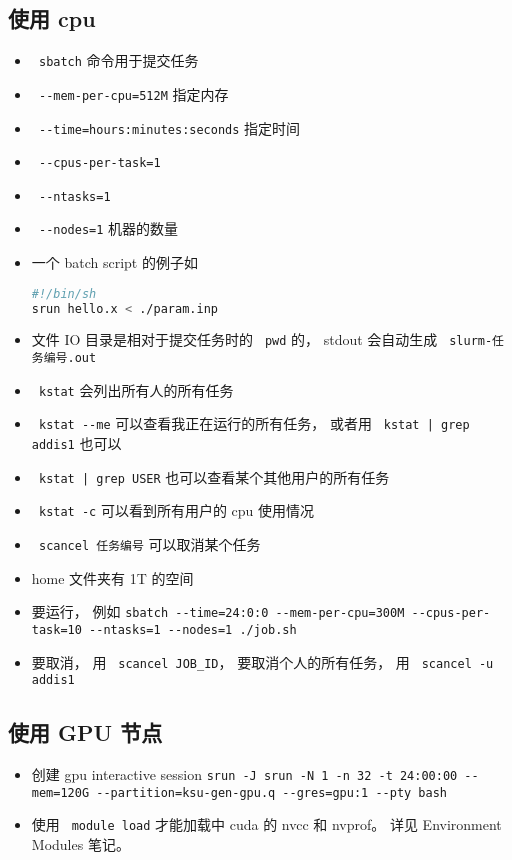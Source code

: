 
\begin{issues}
\issueDraft
\end{issues}

\subsection{使用 cpu}
\begin{itemize}
\item \verb` sbatch` 命令用于提交任务
\item \verb` --mem-per-cpu=512M` 指定内存
\item \verb` --time=hours:minutes:seconds` 指定时间
\item \verb` --cpus-per-task=1`
\item \verb` --ntasks=1`
\item \verb` --nodes=1` 机器的数量
\item 一个 batch script 的例子如
\begin{lstlisting}[language=bash]
#!/bin/sh
srun hello.x < ./param.inp
\end{lstlisting}
\item 文件 IO 目录是相对于提交任务时的 \verb` pwd` 的， stdout 会自动生成 \verb` slurm-任务编号.out`
\item \verb` kstat` 会列出所有人的所有任务
\item \verb` kstat --me` 可以查看我正在运行的所有任务， 或者用 \verb` kstat | grep addis1` 也可以
\item \verb` kstat | grep USER` 也可以查看某个其他用户的所有任务
\item \verb` kstat -c` 可以看到所有用户的 cpu 使用情况
\item \verb` scancel 任务编号` 可以取消某个任务
\item home 文件夹有 1T 的空间
\item 要运行， 例如
\verb|sbatch --time=24:0:0 --mem-per-cpu=300M --cpus-per-task=10 --ntasks=1 --nodes=1 ./job.sh|
\item 要取消， 用 \verb` scancel JOB_ID`， 要取消个人的所有任务， 用 \verb` scancel -u addis1`
\end{itemize}

\subsection{使用 GPU 节点}
\begin{itemize}
\item 创建 gpu interactive session \verb|srun -J srun -N 1 -n 32 -t 24:00:00 --mem=120G --partition=ksu-gen-gpu.q --gres=gpu:1 --pty bash|
\item 使用 \verb` module load` 才能加载中 cuda 的 nvcc 和 nvprof。 详见 Environment Modules 笔记。
\end{itemize}
